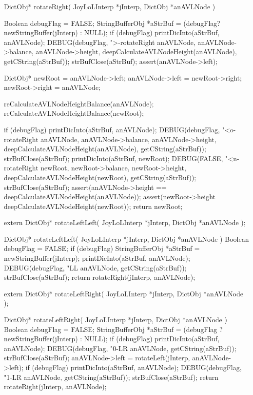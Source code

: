 \startCCode
DictObj* rotateRight(
  JoyLoLInterp *jInterp,
  DictObj      *anAVLNode
) {
  Boolean debugFlag = FALSE;
  StringBufferObj *aStrBuf =
    (debugFlag? newStringBuffer(jInterp) : NULL);
  if (debugFlag) {
    printDicInto(aStrBuf, anAVLNode);
    DEBUG(debugFlag, ">-rotateRight %
          anAVLNode, anAVLNode->balance, anAVLNode->height,
          deepCalculateAVLNodeHeight(anAVLNode),
          getCString(aStrBuf));
    strBufClose(aStrBuf);
  }
  assert(anAVLNode->left);

  DictObj* newRoot = anAVLNode->left;
  anAVLNode->left = newRoot->right;
  newRoot->right  = anAVLNode;

  reCalculateAVLNodeHeightBalance(anAVLNode);
  reCalculateAVLNodeHeightBalance(newRoot);

  if (debugFlag) {
    printDicInto(aStrBuf, anAVLNode);
    DEBUG(debugFlag, "<o-rotateRight %
          anAVLNode, anAVLNode->balance, anAVLNode->height,
          deepCalculateAVLNodeHeight(anAVLNode),
          getCString(aStrBuf));
    strBufClose(aStrBuf);
    printDicInto(aStrBuf, newRoot);
    DEBUG(FALSE, "<n-rotateRight %
          newRoot, newRoot->balance, newRoot->height,
          deepCalculateAVLNodeHeight(newRoot),
          getCString(aStrBuf));
    strBufClose(aStrBuf);
  }
  assert(anAVLNode->height == deepCalculateAVLNodeHeight(anAVLNode));
  assert(newRoot->height == deepCalculateAVLNodeHeight(newRoot));
  return newRoot;
}
\stopCCode

\startCHeader
extern DictObj* rotateLeftLeft(
  JoyLoLInterp *jInterp,
  DictObj      *anAVLNode
);
\stopCHeader

\startCCode
DictObj* rotateLeftLeft(
  JoyLoLInterp *jInterp,
  DictObj      *anAVLNode
) {
  Boolean debugFlag = FALSE;
  if (debugFlag) {
    StringBufferObj *aStrBuf = newStringBuffer(jInterp);
    printDicInto(aStrBuf, anAVLNode);
    DEBUG(debugFlag, "LL %
      anAVLNode, getCString(aStrBuf));
    strBufClose(aStrBuf);
  }
  return rotateRight(jInterp, anAVLNode);
}
\stopCCode

\startCHeader
extern DictObj* rotateLeftRight(
  JoyLoLInterp *jInterp,
  DictObj      *anAVLNode
);
\stopCHeader

\startCCode
DictObj* rotateLeftRight(
  JoyLoLInterp *jInterp,
  DictObj      *anAVLNode
) {
  Boolean debugFlag = FALSE;
  StringBufferObj *aStrBuf =
    (debugFlag ? newStringBuffer(jInterp) : NULL);
  if (debugFlag) {
    printDicInto(aStrBuf, anAVLNode);
    DEBUG(debugFlag, "0-LR %
      anAVLNode, getCString(aStrBuf));
    strBufClose(aStrBuf);
  }
  anAVLNode->left = rotateLeft(jInterp, anAVLNode->left);
  if (debugFlag) {
    printDicInto(aStrBuf, anAVLNode);
    DEBUG(debugFlag, "1-LR %
      anAVLNode, getCString(aStrBuf));
    strBufClose(aStrBuf);
  }
  return rotateRight(jInterp, anAVLNode);
}
\stopCCode

